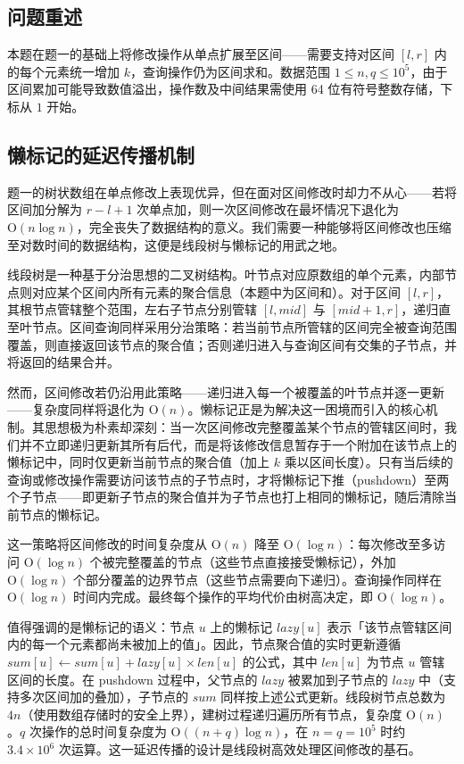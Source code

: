 \documentclass[12pt, a4paper]{academics}
\begin{document}
\subsection{问题重述}

本题在题一的基础上将修改操作从单点扩展至区间——需要支持对区间 $[l, r]$ 内的每个元素统一增加 $k$，查询操作仍为区间求和。数据范围 $1 \le n, q \le 10^5$，由于区间累加可能导致数值溢出，操作数及中间结果需使用 64 位有符号整数存储，下标从 $1$ 开始。

\subsection{懒标记的延迟传播机制}

题一的树状数组在单点修改上表现优异，但在面对区间修改时却力不从心——若将区间加分解为 $r - l + 1$ 次单点加，则一次区间修改在最坏情况下退化为 $\mathrm{O}(n \log n)$，完全丧失了数据结构的意义。我们需要一种能够将区间修改也压缩至对数时间的数据结构，这便是线段树与懒标记的用武之地。

线段树是一种基于分治思想的二叉树结构。叶节点对应原数组的单个元素，内部节点则对应某个区间内所有元素的聚合信息（本题中为区间和）。对于区间 $[l, r]$，其根节点管辖整个范围，左右子节点分别管辖 $[l, \mathit{mid}]$ 与 $[\mathit{mid}+1, r]$，递归直至叶节点。区间查询同样采用分治策略：若当前节点所管辖的区间完全被查询范围覆盖，则直接返回该节点的聚合值；否则递归进入与查询区间有交集的子节点，并将返回的结果合并。

然而，区间修改若仍沿用此策略——递归进入每一个被覆盖的叶节点并逐一更新——复杂度同样将退化为 $\mathrm{O}(n)$。懒标记正是为解决这一困境而引入的核心机制。其思想极为朴素却深刻：当一次区间修改完整覆盖某个节点的管辖区间时，我们并不立即递归更新其所有后代，而是将该修改信息暂存于一个附加在该节点上的懒标记中，同时仅更新当前节点的聚合值（加上 $k$ 乘以区间长度）。只有当后续的查询或修改操作需要访问该节点的子节点时，才将懒标记下推（pushdown）至两个子节点——即更新子节点的聚合值并为子节点也打上相同的懒标记，随后清除当前节点的懒标记。

这一策略将区间修改的时间复杂度从 $\mathrm{O}(n)$ 降至 $\mathrm{O}(\log n)$：每次修改至多访问 $\mathrm{O}(\log n)$ 个被完整覆盖的节点（这些节点直接接受懒标记），外加 $\mathrm{O}(\log n)$ 个部分覆盖的边界节点（这些节点需要向下递归）。查询操作同样在 $\mathrm{O}(\log n)$ 时间内完成。最终每个操作的平均代价由树高决定，即 $\mathrm{O}(\log n)$。

值得强调的是懒标记的语义：节点 $u$ 上的懒标记 $\mathit{lazy}[u]$ 表示「该节点管辖区间内的每一个元素都尚未被加上的值」。因此，节点聚合值的实时更新遵循 $\mathit{sum}[u] \gets \mathit{sum}[u] + \mathit{lazy}[u] \times \mathit{len}[u]$ 的公式，其中 $\mathit{len}[u]$ 为节点 $u$ 管辖区间的长度。在 pushdown 过程中，父节点的 $\mathit{lazy}$ 被累加到子节点的 $\mathit{lazy}$ 中（支持多次区间加的叠加），子节点的 $\mathit{sum}$ 同样按上述公式更新。线段树节点总数为 $4n$（使用数组存储时的安全上界），建树过程递归遍历所有节点，复杂度 $\mathrm{O}(n)$。$q$ 次操作的总时间复杂度为 $\mathrm{O}((n + q) \log n)$，在 $n = q = 10^5$ 时约 $3.4 \times 10^6$ 次运算。这一延迟传播的设计是线段树高效处理区间修改的基石。
\end{document}
